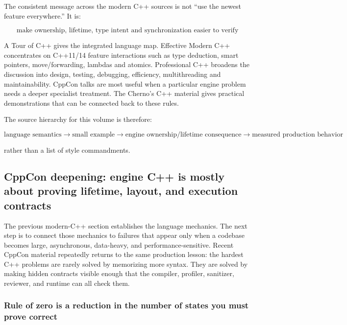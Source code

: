 \hypertarget{01-foundations-i-ch005-explicit-modern-c-is-often-simpler-than-clever-modern-c}{}

The consistent message across the modern C++ sources is not ``use the newest feature everywhere.'' It is:

\[
\boxed{
\text{make ownership, lifetime, type intent and synchronization easier to verify}
}
\]

A Tour of C++ gives the integrated language map. Effective Modern C++ concentrates on C++11/14 feature interactions such as type deduction, smart pointers, move/forwarding, lambdas and atomics. Professional C++ broadens the discussion into design, testing, debugging, efficiency, multithreading and maintainability. CppCon talks are most useful when a particular engine problem needs a deeper specialist treatment. The Cherno's C++ material gives practical demonstrations that can be connected back to these rules.

The source hierarchy for this volume is therefore:

\[
\text{language semantics}
\rightarrow
\text{small example}
\rightarrow
\text{engine ownership/lifetime consequence}
\rightarrow
\text{measured production behavior}
\]

rather than a list of style commandments.

\subsection{CppCon deepening: engine C++ is mostly about proving lifetime, layout, and execution contracts}\label{01-foundations-i-ch005-cppcon-deepening-engine-c-is-mostly-about-proving-lifetime-layout-and-execution-contracts}

\hypertarget{01-foundations-i-ch005-cppcon-deepening-engine-c-is-mostly-about-proving-lifetime-layout-and-execution-contracts}{}

The previous modern-C++ section establishes the language mechanics. The next step is to connect those mechanics to failures that appear only when a codebase becomes large, asynchronous, data-heavy, and performance-sensitive. Recent CppCon material repeatedly returns to the same production lesson: the hardest C++ problems are rarely solved by memorizing more syntax. They are solved by making hidden contracts visible enough that the compiler, profiler, sanitizer, reviewer, and runtime can all check them.

\subsubsection{Rule of zero is a reduction in the number of states you must prove correct}\label{01-foundations-i-ch005-rule-of-zero-is-a-reduction-in-the-number-of-states-you-must-prove-correct}

